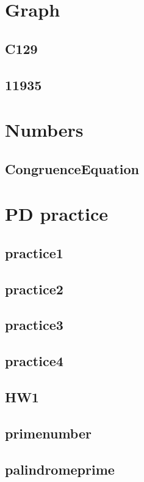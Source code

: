 

\section{Graph}
    \subsection{C129}
        
    \subsection{11935}
        

\section{Numbers}
    \subsection{CongruenceEquation}
        

\section{PD practice}
    \subsection{practice1}
        
    \subsection{practice2}
        
    \subsection{practice3}
        
    \subsection{practice4}
        
    \subsection{HW1}
        
    \subsection{primenumber}
        
    \subsection{palindromeprime}
        
        